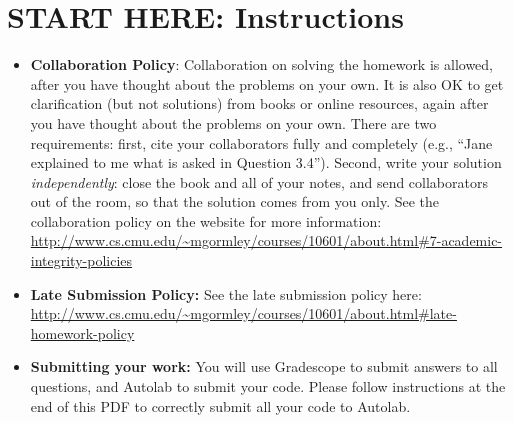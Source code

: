 \documentclass[11pt]{article}
\numberwithin{equation}{section} %
\numberwithin{figure}{section} %
\numberwithin{table}{section} %
\begin{document}
\section*{START HERE: Instructions}
\begin{itemize}

\item \textbf{Collaboration Policy}: Collaboration on solving the homework is allowed, after you have thought about the problems on your own. It is also OK to get clarification (but not solutions) from books or online resources, again after you have thought about the problems on your own. There are two requirements: first, cite your collaborators fully and completely (e.g., ``Jane explained to me what is asked in Question 3.4''). Second, write your solution {\em independently}: close the book and all of your notes, and send collaborators out of the room, so that the solution comes from you only.  See the collaboration policy on the website for more information: \url{http://www.cs.cmu.edu/~mgormley/courses/10601/about.html#7-academic-integrity-policies}
\item\textbf{Late Submission Policy:} See the late submission policy
  here:
  \url{http://www.cs.cmu.edu/~mgormley/courses/10601/about.html#late-homework-policy}

\item\textbf{Submitting your work:} You will use Gradescope to submit
  answers to all questions, and Autolab to submit your code. Please
  follow instructions at the end of this PDF to correctly submit all your code to Autolab.

  \begin{itemize}
    

    

\end{itemize}
\end{itemize}
\end{document}

